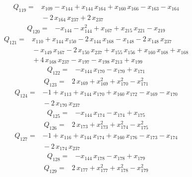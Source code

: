 \documentclass[11pt]{article}
\theoremstyle{definition}\newtheorem{definition}[theorem]{Definition}
\begin{document}
\begin{align*}
Q_{119}={}&x_{109}-x_{144}+x_{144}\,x_{164}+x_{160}\,x_{166}-x_{163}-x_{164}
\\ &{}-2\,x_{164}\,x_{237}+2\,x_{237}
\end{align*}
\begin{align*}
Q_{120}={}&-x_{144}-x_{144}^{2}+x_{167}+x_{215}\,x_{221}-x_{219}
\end{align*}
\begin{align*}
Q_{121}={}&x_{110}+x_{144}\,x_{150}-2\,x_{144}\,x_{168}-x_{148}-2\,x_{148}\,x_{237}
\\ &{}-x_{149}\,x_{167}-2\,x_{150}\,x_{237}+x_{155}\,x_{156}+x_{160}\,x_{168}+x_{168}
\\ &{}+4\,x_{168}\,x_{237}-x_{197}-x_{198}\,x_{213}+x_{199}
\end{align*}
\begin{align*}
Q_{122}={}&-x_{144}\,x_{170}-x_{170}+x_{171}
\end{align*}
\begin{align*}
Q_{123}={}&2\,x_{169}+x_{169}^{2}+x_{170}^{2}-x_{171}^{2}
\end{align*}
\begin{align*}
Q_{124}={}&-1+x_{113}+x_{144}\,x_{170}+x_{160}\,x_{172}-x_{169}-x_{170}
\\ &{}-2\,x_{170}\,x_{237}
\end{align*}
\begin{align*}
Q_{125}={}&-x_{144}\,x_{174}-x_{174}+x_{175}
\end{align*}
\begin{align*}
Q_{126}={}&2\,x_{173}+x_{173}^{2}+x_{174}^{2}-x_{175}^{2}
\end{align*}
\begin{align*}
Q_{127}={}&-1+x_{116}+x_{144}\,x_{174}+x_{160}\,x_{176}-x_{173}-x_{174}
\\ &{}-2\,x_{174}\,x_{237}
\end{align*}
\begin{align*}
Q_{128}={}&-x_{144}\,x_{178}-x_{178}+x_{179}
\end{align*}
\begin{align*}
Q_{129}={}&2\,x_{177}+x_{177}^{2}+x_{178}^{2}-x_{179}^{2}
\end{align*}
\end{document}
